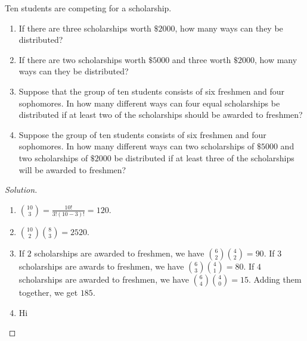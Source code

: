 \documentclass[../main.tex]{subfiles}
\begin{document}
\begin{problem}
Ten students are competing for a scholarship.
\begin{enumerate}
\item If there are three scholarships worth $\$2000$, how many ways can they be distributed?
\item If there are two scholarships worth $\$5000$ and three worth $\$2000$, how many ways can they be distributed?
\item Suppose that the group of ten students consists of six freshmen and four sophomores. In how many different ways can four equal scholarships be distributed if at least two of the scholarships should be awarded to freshmen?
\item Suppose the group of ten students consists of six freshmen and four sophomores. In how many different ways can two scholarships of $\$5000$ and two scholarships of $\$2000$ be distributed if at least three of the scholarships will be awarded to freshmen?
\end{enumerate}
\end{problem}
\begin{proof}[Solution]
\
\begin{enumerate}
\item $\binom{10}{3} = \frac{10!}{3!(10-3)!} = 120$.
\item $\binom{10}{2}\binom{8}{3} = 2520$.
\item If $2$ scholarships are awarded to freshmen, we have $\binom{6}{2}\binom{4}{2} = 90$. If $3$ scholarships are awards to freshmen, we have $\binom{6}{3}\binom{4}{1} = 80$. If $4$ scholarships are awarded to freshmen, we have $\binom{6}{4}\binom{4}{0} = 15$. Adding them together, we get $185$.
\item Hi
\end{enumerate}
\end{proof}
\end{document}
